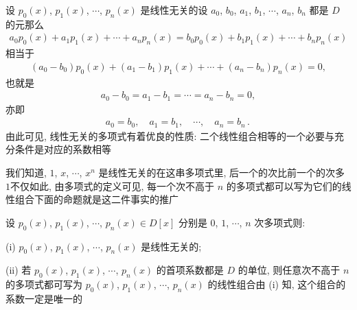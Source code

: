\begin{remark}
    设 $p_0 (x)$, $p_1 (x)$, $\cdots$, $p_n (x)$ 是线性无关的\period 设 $a_0$, $b_0$, $a_1$, $b_1$, $\cdots$, $a_n$, $b_n$ 都是 $D$ 的元\period 那么
    \begin{align*}
        a_0 p_0 (x) + a_1 p_1 (x) + \cdots + a_n p_n (x) = b_0 p_0 (x) + b_1 p_1 (x) + \cdots + b_n p_n (x)
    \end{align*}
    相当于
    \begin{align*}
        (a_0 - b_0) p_0 (x) + (a_1 - b_1) p_1 (x) + \cdots + (a_n - b_n) p_n (x) = 0,
    \end{align*}
    也就是
    \begin{align*}
        a_0 - b_0 = a_1 - b_1 = \cdots = a_n - b_n = 0,
    \end{align*}
    亦即
    \begin{align*}
        a_0 = b_0, \quad a_1 = b_1, \quad \cdots, \quad a_n = b_n \period
    \end{align*}
    由此可见, 线性无关的多项式有着优良的性质: 二个线性组合相等的一个必要与充分条件是对应的系数相等\period
\end{remark}

我们知道, $1$, $x$, $\cdots$, $x^n$ 是线性无关的\period 在这串多项式里, 后一个的次比前一个的次多 $1$\period 不仅如此, 由多项式的定义可见, 每一个次不高于 $n$ 的多项式都可以写为它们的线性组合\period 下面的命题就是这二件事实的推广\period

\begin{proposition}
    设 $p_0 (x)$, $p_1 (x)$, $\cdots$, $p_n (x) \in D[x]$ 分别是 $0$, $1$, $\cdots$, $n$ 次多项式\period 则:

    (i) $p_0 (x)$, $p_1 (x)$, $\cdots$, $p_n (x)$ 是线性无关的;

    (ii) 若 $p_0 (x)$, $p_1 (x)$, $\cdots$, $p_n (x)$ 的首项系数都是 $D$ 的单位, 则任意次不高于 $n$ 的多项式都可写为 $p_0 (x)$, $p_1 (x)$, $\cdots$, $p_n (x)$ 的线性组合\period 由 (i) 知, 这个组合的系数一定是唯一的\period
\end{proposition}


